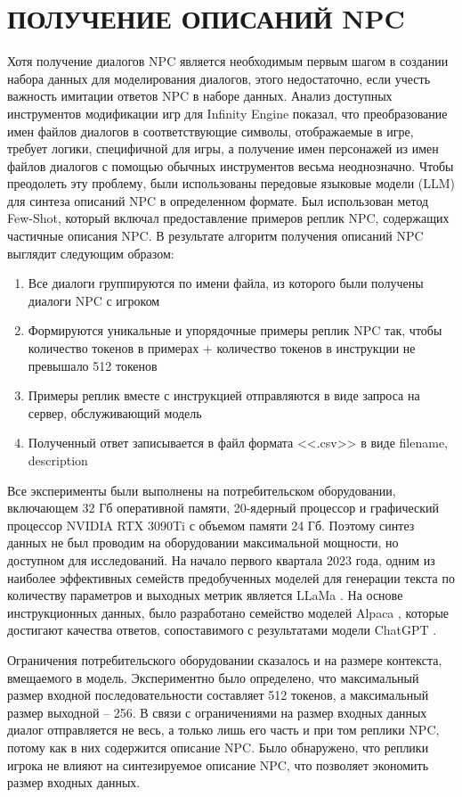 \section{ПОЛУЧЕНИЕ ОПИСАНИЙ NPC}

Хотя получение диалогов NPC является необходимым первым шагом в создании набора данных для моделирования диалогов, этого недостаточно, если учесть важность имитации ответов NPC в наборе данных. Анализ доступных инструментов модификации игр для Infinity Engine показал, что преобразование имен файлов диалогов в соответствующие символы, отображаемые в игре, требует логики, специфичной для игры, а получение имен персонажей из имен файлов диалогов с помощью обычных инструментов весьма неоднозначно. Чтобы преодолеть эту проблему, были использованы передовые языковые модели (LLM) для синтеза описаний NPC в определенном формате. Был использован метод Few-Shot, который включал предоставление примеров реплик NPC, содержащих частичные описания NPC. В результате алгоритм получения описаний NPC выглядит следующим образом:
\begin{enumerate}
  \item Все диалоги группируются по имени файла, из которого были получены диалоги NPC с игроком
  \item Формируются уникальные и упорядочные примеры реплик NPC так, чтобы количество токенов в примерах + количество токенов в инструкции не превышало 512 токенов
  \item Примеры реплик вместе с инструкцией отправляются в виде запроса на сервер, обслуживающий модель
  \item Полученный ответ записывается в файл формата <<.csv>> в виде filename, description
\end{enumerate}

Все эксперименты были выполнены на потребительском оборудовании, включающем 32 Гб оперативной памяти, 20-ядерный процессор и графический процессор NVIDIA RTX 3090Ti с объемом памяти 24 Гб. Поэтому синтез данных не был проводим на оборудовании максимальной мощности, но доступном для исследований. На начало первого квартала 2023 года, одним из наиболее эффективных семейств предобученных моделей для генерации текста по количеству параметров и выходных метрик является LLaMa \cite{llama-paper}. На основе инструкционных данных, было разработано семейство моделей Alpaca \cite{alpaca-docs}, которые достигают качества ответов, сопоставимого с результатами модели ChatGPT \cite{chatgpt-docs}.

Ограничения потребительского оборудовании сказалось и на размере контекста, вмещаемого в модель. Экспериментно было определено, что максимальный размер входной последовательности составляет 512 токенов, а максимальный размер выходной -- 256. В связи с ограничениями на размер входных данных диалог отправляется не весь, а только лишь его часть и при том реплики NPC, потому как в них содержится описание NPC. Было обнаружено, что реплики игрока не влияют на синтезируемое описание NPC, что позволяет экономить размер входных данных. 

